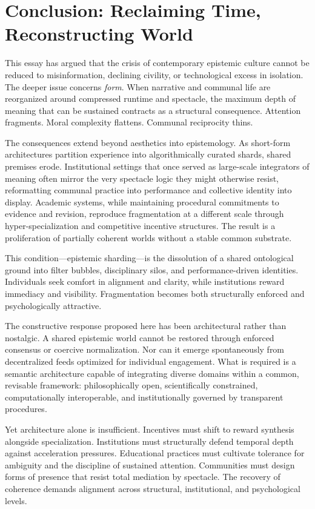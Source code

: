 \documentclass[11pt]{article}
\begin{document}
\section{Conclusion: Reclaiming Time, Reconstructing World}
\label{sec:conclusion}

This essay has argued that the crisis of contemporary epistemic culture cannot be reduced to misinformation, declining civility, or technological excess in isolation. The deeper issue concerns \emph{form}. When narrative and communal life are reorganized around compressed runtime and spectacle, the maximum depth of meaning that can be sustained contracts as a structural consequence. Attention fragments. Moral complexity flattens. Communal reciprocity thins.

The consequences extend beyond aesthetics into epistemology. As short-form architectures partition experience into algorithmically curated shards, shared premises erode. Institutional settings that once served as large-scale integrators of meaning often mirror the very spectacle logic they might otherwise resist, reformatting communal practice into performance and collective identity into display. Academic systems, while maintaining procedural commitments to evidence and revision, reproduce fragmentation at a different scale through hyper-specialization and competitive incentive structures. The result is a proliferation of partially coherent worlds without a stable common substrate.

This condition---epistemic sharding---is the dissolution of a shared ontological ground into filter bubbles, disciplinary silos, and performance-driven identities. Individuals seek comfort in alignment and clarity, while institutions reward immediacy and visibility. Fragmentation becomes both structurally enforced and psychologically attractive.

The constructive response proposed here has been architectural rather than nostalgic. A shared epistemic world cannot be restored through enforced consensus or coercive normalization. Nor can it emerge spontaneously from decentralized feeds optimized for individual engagement. What is required is a semantic architecture capable of integrating diverse domains within a common, revisable framework: philosophically open, scientifically constrained, computationally interoperable, and institutionally governed by transparent procedures.

Yet architecture alone is insufficient. Incentives must shift to reward synthesis alongside specialization. Institutions must structurally defend temporal depth against acceleration pressures. Educational practices must cultivate tolerance for ambiguity and the discipline of sustained attention. Communities must design forms of presence that resist total mediation by spectacle. The recovery of coherence demands alignment across structural, institutional, and psychological levels.
\end{document}
